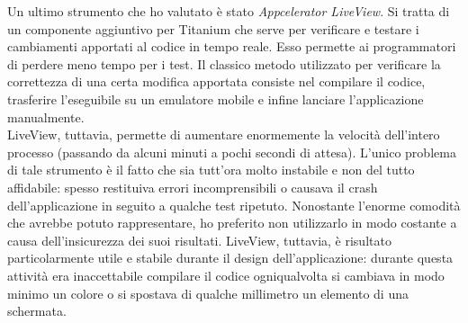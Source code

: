 				Un ultimo strumento che ho valutato è stato \emph{Appcelerator LiveView}. Si tratta di un componente aggiuntivo per
				Titanium che serve per verificare e testare i cambiamenti apportati al codice in tempo reale. Esso permette ai
				programmatori di perdere meno tempo per i test. Il classico metodo utilizzato per verificare la correttezza
				di una certa modifica apportata consiste nel compilare il codice, trasferire l'eseguibile su un emulatore mobile e
				infine lanciare l'applicazione manualmente.\\
				
				\noindent LiveView, tuttavia, permette di aumentare enormemente la velocità dell'intero processo (passando da alcuni
				minuti a pochi secondi di attesa). L'unico problema di tale strumento è il fatto che sia tutt'ora molto instabile e
				non del tutto affidabile: spesso restituiva errori incomprensibili o causava il crash dell'applicazione in seguito a
				qualche test ripetuto. Nonostante l'enorme comodità che avrebbe potuto rappresentare, ho preferito non utilizzarlo
				in modo costante a causa dell'insicurezza dei suoi risultati. LiveView, tuttavia, è risultato particolarmente utile
				e stabile durante il design dell'applicazione: durante questa attività era inaccettabile compilare il codice
				ogniqualvolta si cambiava in modo minimo un colore o si spostava di qualche millimetro un elemento di una schermata.
